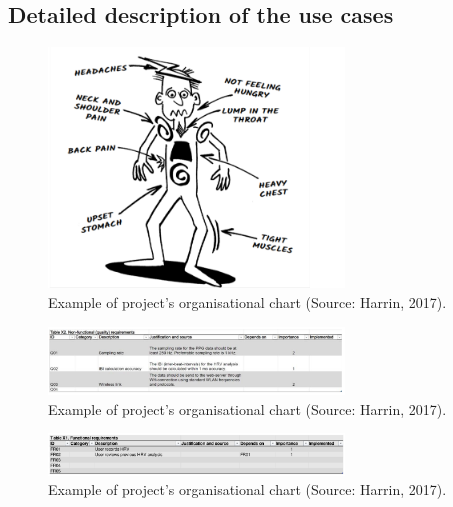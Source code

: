 \documentclass{article}
\begin{document}
\subsection{Detailed description of the use cases}

\label{sec:references}



\begin{figure}[h]
  \centering
  \includegraphics[width=0.7\textwidth]{sick.png}
  \caption{ Example of project's organisational chart (Source: Harrin, 2017).}
  \label{harrin}
\end{figure}



\begin{figure}[h]
  \centering
  \includegraphics[width=0.7\textwidth]{screenshot2.png}
  \caption{ Example of project's organisational chart (Source: Harrin, 2017).}
  \label{harrin}
\end{figure}

\begin{figure}[h]
  \centering
  \includegraphics[width=0.7\textwidth]{screenshot.png}
  \caption{ Example of project's organisational chart (Source: Harrin, 2017).}
  \label{harrin}
\end{figure}
\end{document}
